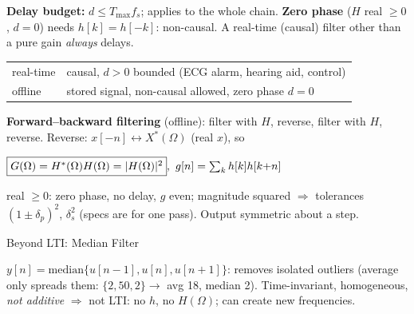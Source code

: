 \documentclass[a4paper,landscape]{article}
\newcommand{\sub}[1]{\par\vspace{0.6pt}\noindent\colorbox{subblue}{\parbox{\dimexpr\linewidth-2\fboxsep}{\bfseries\strut #1}}\par\vspace{0.2pt}}
\newcommand{\bx}[1]{\fbox{$\textstyle #1$}}
\newcommand{\eqc}[1]{\par\vspace{0.2pt}\centerline{$#1$}\par\vspace{0.2pt}}
\begin{document}
\begin{multicols*}{4}
\textbf{Delay budget:} $d\le T_{\max}f_s$; applies to the whole chain.
\textbf{Zero phase} ($H$ real $\ge0$, $d=0$) needs $h[k]=h[-k]$: non-causal. A real-time (causal) filter other than a pure gain \emph{always} delays.
\begin{tabularx}{\linewidth}{@{}lY@{}}
real-time & causal, $d>0$ bounded (ECG alarm, hearing aid, control)\\
offline & stored signal, non-causal allowed, zero phase $d=0$
\end{tabularx}
\textbf{Forward--backward filtering} (offline): filter with $H$, reverse, filter with $H$, reverse. Reverse: $x[-n]\leftrightarrow X^*(\Omega)$ (real $x$), so
\eqc{\bx{G(\Omega)=H^*(\Omega)H(\Omega)=|H(\Omega)|^2},\ g[n]=\textstyle\sum_kh[k]h[k{+}n]}
real $\ge0$: zero phase, no delay, $g$ even; magnitude squared $\Rightarrow$ tolerances $(1\pm\delta_p)^2$, $\delta_s^2$ (specs are for one pass). Output symmetric about a step.
\sub{Beyond LTI: Median Filter}
$y[n]=\mathrm{median}\{u[n{-}1],u[n],u[n{+}1]\}$: removes isolated outliers (average only spreads them: $\{2,50,2\}\to$ avg 18, median 2). Time-invariant, homogeneous, \emph{not additive} $\Rightarrow$ not LTI: no $h$, no $H(\Omega)$; can create new frequencies.


\end{multicols*}
\end{document}

